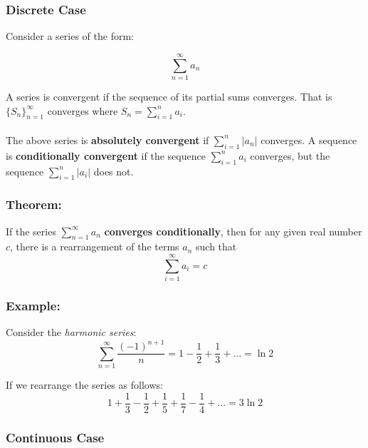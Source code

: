 \documentclass{article}
\begin{document}
    \subsubsection{Discrete Case}
    
    Consider a series of the form:
    
    \begin{equation*}
        \sum_{n=1}^\infty a_n 
    \end{equation*}
    
    \noindent A series is convergent if the sequence of its partial sums converges. That is $\{ S_n\}_{n=1}^\infty$ converges where $S_n = \sum_{i=1}^n a_i$. 
    \\~\\
    \noindent The above series is \textbf{absolutely convergent} if $\sum_{i=1}^n |a_n|$ converges. A sequence is \textbf{conditionally convergent} if the sequence $\sum_{i=1}^n a_i$ converges, but the sequence $\sum_{i=1}^n |a_i|$ does not.
    
    \subsubsection*{Theorem:}
    If the series $\sum_{n=1}^\infty a_n$ \textbf{converges conditionally}, then for any given real number $c$, there is a rearrangement of the terms $a_n$ such that
    \begin{equation*}
        \sum_{i=1}^\infty a_i = c
    \end{equation*}
    
    \subsubsection*{Example:}
    
    Consider the \textit{harmonic series}:
    \begin{equation*}
        \sum_{n=1}^\infty \frac{(-1)^{n+1}}{n} = 1 - \frac{1}{2} + \frac{1}{3} + ... = \ln 2
    \end{equation*}
    
    If we rearrange the series as follows:
    \begin{equation*}
        1 + \frac{1}{3} - \frac{1}{2} + \frac{1}{5} + \frac{1}{7} - \frac{1}{4} + ... = 3\ln 2
    \end{equation*}
    
    \subsubsection{Continuous Case}
    
\end{document}
